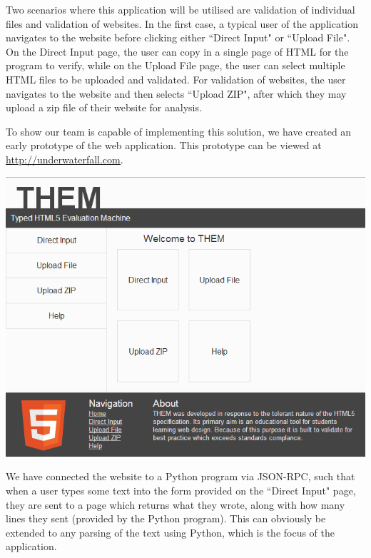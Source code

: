 \documentclass[12pt]{article}
\begin{document}
Two scenarios where this application will be utilised are validation of individual files and validation of websites. In the first case, a typical user of the application navigates to the website before clicking either ``Direct Input" or ``Upload File". On the Direct Input page, the user can copy in a single page of HTML for the program to verify, while on the Upload File page, the user can select multiple HTML files to be uploaded and validated. For validation of websites, the user navigates to the website and then selects ``Upload ZIP", after which they may upload a zip file of their website for analysis.

To show our team is capable of implementing this solution, we have created an early prototype of the web application. This prototype can be viewed at \underline{\url{http://underwaterfall.com}}. 

\includegraphics[scale=0.65]{index.png}

We have connected the website to a Python program via JSON-RPC, such that when a user types some text into the form provided on the ``Direct Input" page, they are sent to a page which returns what they wrote, along with how many lines they sent (provided by the Python program). This can obviously be extended to any parsing of the text using Python, which is the focus of the application.
\end{document}
